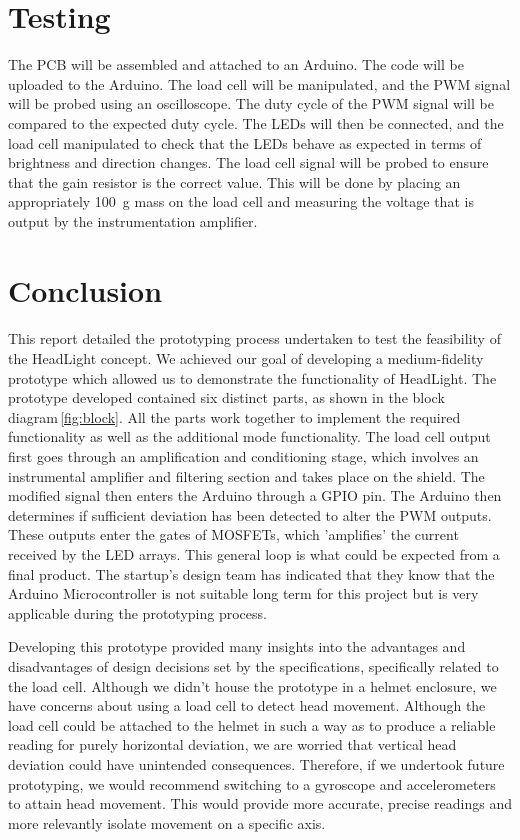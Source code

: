 \documentclass[twoside]{article}
\begin{document}
\section{Testing}
    The PCB will be assembled and attached to an Arduino. The code will be uploaded to the Arduino. The load cell will be manipulated, and the PWM signal will be probed using an oscilloscope. The duty cycle of the PWM signal will be compared to the expected duty cycle.
    The LEDs will then be connected, and the load cell manipulated to check that the LEDs behave as expected in terms of brightness and direction changes. 
    The load cell signal will be probed to ensure that the gain resistor is the correct value. This will be done by placing an appropriately \SI{100}{\gram} mass on the load cell and measuring the voltage that is output by the instrumentation amplifier.

\section{Conclusion}
    \paragraph{}
    This report detailed the prototyping process undertaken to test the feasibility of the HeadLight concept. We achieved our goal of developing a medium-fidelity prototype which allowed us to demonstrate the functionality of HeadLight. The prototype developed contained six distinct parts, as shown in the block diagram \ref{fig:block}. All the parts work together to implement the required functionality as well as the additional mode functionality. The load cell output first goes through an amplification and conditioning stage, which involves an instrumental amplifier and filtering section and takes place on the shield. The modified signal then enters the Arduino through a GPIO pin. The Arduino then determines if sufficient deviation has been detected to alter the PWM outputs. These outputs enter the gates of MOSFETs, which 'amplifies' the current received by the LED arrays. This general loop is what could be expected from a final product. The startup's design team has indicated that they know that the Arduino Microcontroller is not suitable long term for this project but is very applicable during the prototyping process. 

    Developing this prototype provided many insights into the advantages and disadvantages of design decisions set by the specifications, specifically related to the load cell. Although we didn't house the prototype in a helmet enclosure, we have concerns about using a load cell to detect head movement. Although the load cell could be attached to the helmet in such a way as to produce a reliable reading for purely horizontal deviation, we are worried that vertical head deviation could have unintended consequences. Therefore, if we undertook future prototyping, we would recommend switching to a gyroscope and accelerometers to attain head movement. This would provide more accurate, precise readings and more relevantly isolate movement on a specific axis. 
\end{document}
